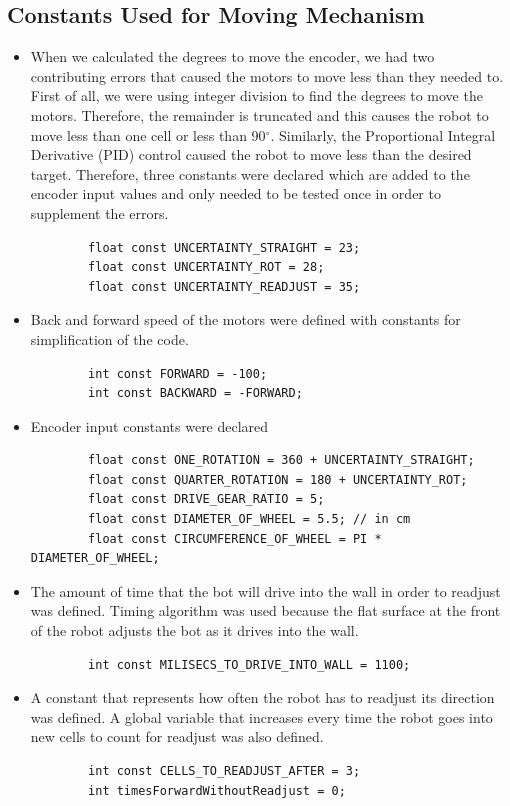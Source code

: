 \documentclass[11pt]{article}
\begin{document}

\subsection{Constants Used for Moving Mechanism}
\begin{itemize}
\item When we calculated the degrees to move the encoder, we had two contributing errors that caused the motors to move less than they needed to. First of all, we were using integer division to find the degrees to move the motors. Therefore, the remainder is truncated and this causes the robot to move less than one cell or less than 90$^{\circ}$. Similarly, the Proportional Integral Derivative (PID) control caused the robot to move less than the desired target. Therefore, three constants were declared which are added to the encoder input values and only needed to be tested once in order to supplement the errors. 
	\begin{verbatim}
		float const UNCERTAINTY_STRAIGHT = 23;
		float const UNCERTAINTY_ROT = 28;
		float const UNCERTAINTY_READJUST = 35;
	\end{verbatim} 
\item Back and forward speed of the motors were defined with constants for simplification of the code. 
	\begin{verbatim}
		int const FORWARD = -100;
		int const BACKWARD = -FORWARD;
	\end{verbatim} 
\item Encoder input constants were declared
	\begin{verbatim}
		float const ONE_ROTATION = 360 + UNCERTAINTY_STRAIGHT;
		float const QUARTER_ROTATION = 180 + UNCERTAINTY_ROT;
		float const DRIVE_GEAR_RATIO = 5;
		float const DIAMETER_OF_WHEEL = 5.5; // in cm
		float const CIRCUMFERENCE_OF_WHEEL = PI * DIAMETER_OF_WHEEL;
	\end{verbatim} 
\item The amount of time that the bot will drive into the wall in order to readjust was defined. Timing algorithm was used because the flat surface at the front of the robot adjusts the bot as it drives into the wall.
	\begin{verbatim}
		int const MILISECS_TO_DRIVE_INTO_WALL = 1100;
	\end{verbatim} 
\item A constant that represents how often the robot has to readjust its direction was defined. A global variable that increases every time the robot goes into new cells to count for readjust was also defined.
	\begin{verbatim}
		int const CELLS_TO_READJUST_AFTER = 3;
		int timesForwardWithoutReadjust = 0;
	\end{verbatim}  
\end{itemize}
\newpage
\end{document}
